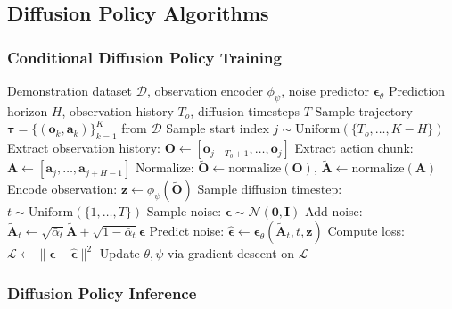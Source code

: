 \subsection{Diffusion Policy Algorithms}
\label{subsec:diffusion_policy_algorithms}

\subsubsection{Conditional Diffusion Policy Training}

\begin{algorithm}[H]
\caption{Diffusion Policy Training}
\label{alg:diffusion_policy_training_full}
\begin{algorithmic}[1]
\REQUIRE Demonstration dataset $\mathcal{D}$, observation encoder $\phi_\psi$, noise predictor $\boldsymbol{\epsilon}_\theta$
\REQUIRE Prediction horizon $H$, observation history $T_o$, diffusion timesteps $T$
\REPEAT
    \STATE Sample trajectory $\boldsymbol{\tau} = \{(\mathbf{o}_k, \mathbf{a}_k)\}_{k=1}^{K}$ from $\mathcal{D}$
    \STATE Sample start index $j \sim \text{Uniform}(\{T_o, \ldots, K-H\})$
    \STATE Extract observation history: $\mathbf{O} \gets [\mathbf{o}_{j-T_o+1}, \ldots, \mathbf{o}_j]$
    \STATE Extract action chunk: $\mathbf{A} \gets [\mathbf{a}_j, \ldots, \mathbf{a}_{j+H-1}]$
    \STATE Normalize: $\tilde{\mathbf{O}} \gets \text{normalize}(\mathbf{O})$, $\tilde{\mathbf{A}} \gets \text{normalize}(\mathbf{A})$
    \STATE Encode observation: $\mathbf{z} \gets \phi_\psi(\tilde{\mathbf{O}})$
    \STATE Sample diffusion timestep: $t \sim \text{Uniform}(\{1, \ldots, T\})$
    \STATE Sample noise: $\boldsymbol{\epsilon} \sim \mathcal{N}(\mathbf{0}, \mathbf{I})$
    \STATE Add noise: $\tilde{\mathbf{A}}_t \gets \sqrt{\bar{\alpha}_t} \tilde{\mathbf{A}} + \sqrt{1-\bar{\alpha}_t} \boldsymbol{\epsilon}$
    \STATE Predict noise: $\hat{\boldsymbol{\epsilon}} \gets \boldsymbol{\epsilon}_\theta(\tilde{\mathbf{A}}_t, t, \mathbf{z})$
    \STATE Compute loss: $\mathcal{L} \gets \|\boldsymbol{\epsilon} - \hat{\boldsymbol{\epsilon}}\|^2$
    \STATE Update $\theta, \psi$ via gradient descent on $\mathcal{L}$
\end{algorithmic}
\end{algorithm}

\subsubsection{Diffusion Policy Inference}

